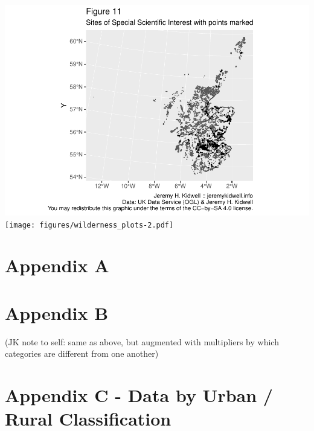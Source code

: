 \documentclass[11pt,]{article}
\begin{document}
\includegraphics{figures/wilderness_plots-1.pdf}
\texttt{[image: figures/wilderness\_plots-2.pdf]}

\hypertarget{appendix-a}{%
\section{Appendix A}\label{appendix-a}}

\hypertarget{appendix-b}{%
\section{Appendix B}\label{appendix-b}}

(JK note to self: same as above, but augmented with multipliers by which
categories are different from one another)

\hypertarget{appendix-c---data-by-urban-rural-classification}{%
\section{Appendix C - Data by Urban / Rural
Classification}\label{appendix-c---data-by-urban-rural-classification}}

\renewcommand\refname{Citations}

\end{document}

